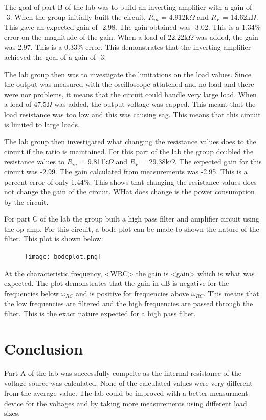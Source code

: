\documentclass[twocolumn, amsmath]{revtex4}
\begin{document}
The goal of part B of the lab was to build an inverting amplifier with a gain of -3. When the group initially built the circuit, $R_{in}$ = 4.912k$\Omega$ and $R_{F}$ = 14.62k$\Omega$. This gave an expected gain of -2.98. The gain obtained was -3.02. This is a 1.34\% error on the magnitude of the gain. When a load of 22.22k$\Omega$ was added, the gain was 2.97. This is a 0.33\% error. This demonstrates that the inverting amplifier achieved the goal of a gain of -3. 

The lab group then was to investigate the limitations on the load values. Since the output was measured with the oscilloscope attatched and no load and there were nor problems, it means that the circuit could handle very large load. When a load of 47.5$\Omega$ was added, the output voltage was capped. This meant that the load resistance was too low and this was causing sag. This means that this circuit is limited to large loads. 

The lab group then investigated what changing the resistance values does to the circuit if the ratio is maintained. For this part of the lab the group doubled the resistance values to $R_{in}$ = 9.811k$\Omega$ and $R_{F}$ = 29.38k$\Omega$. The expected gain for this circuit was -2.99. The gain calculated from measurements was -2.95. This is a percent error of only 1.44\%. This shows that changing the resistance values does not change the gain of the circuit. WHat does change is the power consumption by the circuit.

For part C of the lab the group built a high pass filter and amplifier circuit using the op amp. For this circuit, a bode plot can be made to shown the nature of the filter. This plot is shown below:

\begin{figure}[h]
    \texttt{[image: bodeplot.png]}  
    \caption{}
\end{figure}

At the characteristic frequency, <WRC> the gain is <gain> which is what was expected. The plot demonstrates that the gain in dB is negative for the frequencies below $\omega_{RC}$ and is positive for frequencies above $\omega_{RC}$. This means that the low frequencies are filtered and the high frequencies are passed through the filter. This is the exact nature expected for a high pass filter.

\section{Conclusion}
Part A of the lab was successfully compelte as the internal resistance of the voltage source was calculated. None of the calculated values were very different from the average value. The lab could be improved with a better measurment device for the voltages and by taking more measurements using different load sizes.
\end{document}

